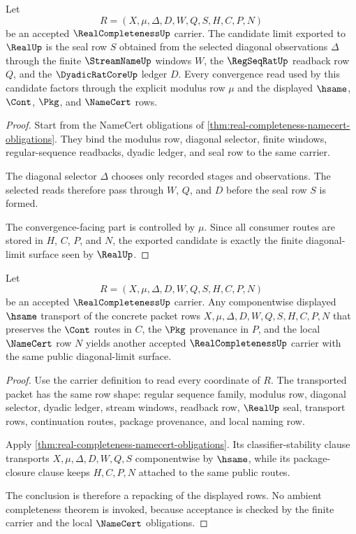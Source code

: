 \begin{theorem}
\label{thm:real-completeness-diagonal-limit-candidate}
Let
$$
R=(X,\mu,\Delta,D,W,Q,S,H,C,P,N)
$$
be an accepted $\RealCompletenessUp$ carrier. The candidate limit exported to $\RealUp$ is the seal row $S$ obtained from the selected diagonal observations $\Delta$ through the finite $\StreamNameUp$ windows $W$, the $\RegSeqRatUp$ readback row $Q$, and the $\DyadicRatCoreUp$ ledger $D$. Every convergence read used by this candidate factors through the explicit modulus row $\mu$ and the displayed $\hsame$, $\Cont$, $\Pkg$, and $\NameCert$ rows.
\end{theorem}
\begin{proof}
Start from the NameCert obligations of \autoref{thm:real-completeness-namecert-obligations}. They bind the modulus row, diagonal selector, finite windows, regular-sequence readbacks, dyadic ledger, and seal row to the same carrier.

The diagonal selector $\Delta$ chooses only recorded stages and observations. The selected reads therefore pass through $W$, $Q$, and $D$ before the seal row $S$ is formed.

The convergence-facing part is controlled by $\mu$. Since all consumer routes are stored in $H$, $C$, $P$, and $N$, the exported candidate is exactly the finite diagonal-limit surface seen by $\RealUp$.
\end{proof}

\begin{theorem}
\label{thm:real-completeness-carrier-transport}
Let
$$
R=(X,\mu,\Delta,D,W,Q,S,H,C,P,N)
$$
be an accepted $\RealCompletenessUp$ carrier. Any componentwise displayed $\hsame$ transport of the concrete packet rows $X,\mu,\Delta,D,W,Q,S,H,C,P,N$ that preserves the $\Cont$ routes in $C$, the $\Pkg$ provenance in $P$, and the local $\NameCert$ row $N$ yields another accepted $\RealCompletenessUp$ carrier with the same public diagonal-limit surface.
\end{theorem}
\begin{proof}
Use the carrier definition to read every coordinate of $R$. The transported packet has the same row shape: regular sequence family, modulus row, diagonal selector, dyadic ledger, stream windows, readback row, $\RealUp$ seal, transport rows, continuation routes, package provenance, and local naming row.

Apply \autoref{thm:real-completeness-namecert-obligations}. Its classifier-stability clause transports $X,\mu,\Delta,D,W,Q,S$ componentwise by $\hsame$, while its package-closure clause keeps $H,C,P,N$ attached to the same public routes.

The conclusion is therefore a repacking of the displayed rows. No ambient completeness theorem is invoked, because acceptance is checked by the finite carrier and the local $\NameCert$ obligations.
\end{proof}

